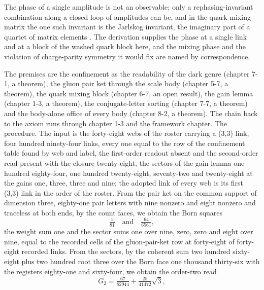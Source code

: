 \begin{chbridge}
The phase of a single amplitude is not an observable; only a rephasing-invariant combination along a closed loop of amplitudes can be, and in the quark mixing matrix the one such invariant is the Jarlskog invariant, the imaginary part of a quartet of matrix elements \cite{Jarlskog1985,Kobayashi1973}. The derivation supplies the phase at a single link and at a block of the washed quark block here, and the mixing phase and the violation of charge-parity symmetry it would fix are named by correspondence.
\end{chbridge}
\begin{chproof}[finite]
The premises are the confinement as the readability of the dark genre (chapter 7-1, a theorem), the gluon pair ket through the scale body (chapter 5-7, a theorem), the quark mixing block (chapter 6-7, an open result), the gain lemma (chapter 1-3, a theorem), the conjugate-letter sorting (chapter 7-7, a theorem) and the body-alone office of every body (chapter 8-2, a theorem). The chain back to the axiom runs through chapter 1-3 and the framework chapter. The procedure. The input is the forty-eight webs of the roster carrying a (3,3) link, four hundred ninety-four links, every one equal to the row of the confinement table found by web and label, the first-order readout absent and the second-order read present with the closure twenty-eight, the sectors of the gain lemma one hundred eighty-four, one hundred twenty-eight, seventy-two and twenty-eight at the gains one, three, three and nine; the adopted link of every web is its first (3,3) link in the order of the roster. From the pair ket on the common support of dimension three, eighty-one pair letters with nine nonzero and eight nonzero and traceless at both ends, by the count faces, we obtain the Born squares
\begin{equation}
\tfrac{1}{81} \quad\text{and}\quad \tfrac{64}{6561} ,
\end{equation}
the weight sum one and the sector sums one over nine, zero, zero and eight over nine, equal to the recorded cells of the gluon-pair-ket row at forty-eight of forty-eight recorded links. From the sectors, by the coherent sum two hundred sixty-eight plus two hundred root three over the Born face one thousand thirty-six with the registers eighty-one and sixty-four, we obtain the order-two read
\begin{equation}
G_{2} = \tfrac{67}{82944} + \tfrac{25}{41472}\sqrt{3} ,
\end{equation}

\end{chproof}
